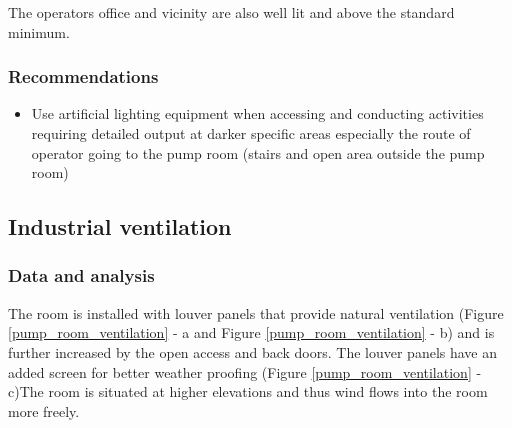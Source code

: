 The operators office and vicinity are also well lit and above the standard minimum. 


\subsubsection{Recommendations}

\begin{itemize}
	\item	Use artificial lighting equipment when accessing and conducting activities requiring detailed output at darker specific areas especially the route of operator going to the pump room (stairs and open area outside the pump room)

\end{itemize}


\subsection{Industrial ventilation}\label{aq04}
\subsubsection{Data and analysis}


The room is installed with louver panels that provide natural ventilation (Figure \ref{pump_room_ventilation} - a and Figure \ref{pump_room_ventilation} - b) and is further increased by the open access and back doors. The louver panels have an added screen for better weather proofing (Figure \ref {pump_room_ventilation} - c)The room is situated at higher elevations and thus wind flows into the room more freely.

